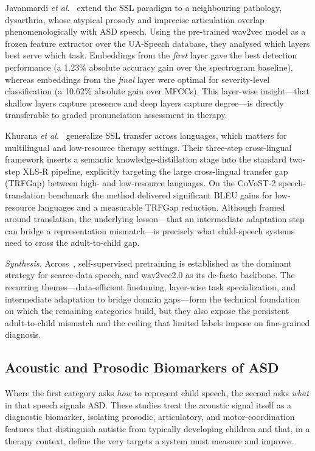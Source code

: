 \documentclass[conference]{IEEEtran}
\begin{document}
Javanmardi \textit{et al.}~\cite{ref4} extend the SSL paradigm to a neighbouring pathology, dysarthria, whose atypical prosody and imprecise articulation overlap phenomenologically with ASD speech. Using the pre-trained wav2vec model as a frozen feature extractor over the UA-Speech database, they analysed which layers best serve which task. Embeddings from the \emph{first} layer gave the best detection performance (a 1.23\% absolute accuracy gain over the spectrogram baseline), whereas embeddings from the \emph{final} layer were optimal for severity-level classification (a 10.62\% absolute gain over MFCCs). This layer-wise insight---that shallow layers capture presence and deep layers capture degree---is directly transferable to graded pronunciation assessment in therapy.

Khurana \textit{et al.}~\cite{ref5} generalize SSL transfer across languages, which matters for multilingual and low-resource therapy settings. Their three-step cross-lingual framework inserts a semantic knowledge-distillation stage into the standard two-step XLS-R pipeline, explicitly targeting the large cross-lingual transfer gap (TRFGap) between high- and low-resource languages. On the CoVoST-2 speech-translation benchmark the method delivered significant BLEU gains for low-resource languages and a measurable TRFGap reduction. Although framed around translation, the underlying lesson---that an intermediate adaptation step can bridge a representation mismatch---is precisely what child-speech systems need to cross the adult-to-child gap.

\emph{Synthesis.} Across~\cite{ref1,ref2,ref3,ref4,ref5}, self-supervised pretraining is established as the dominant strategy for scarce-data speech, and wav2vec2.0 as its de-facto backbone. The recurring themes---data-efficient finetuning, layer-wise task specialization, and intermediate adaptation to bridge domain gaps---form the technical foundation on which the remaining categories build, but they also expose the persistent adult-to-child mismatch and the ceiling that limited labels impose on fine-grained diagnosis.

\subsection{Acoustic and Prosodic Biomarkers of ASD}
Where the first category asks \emph{how} to represent child speech, the second asks \emph{what} in that speech signals ASD. These studies treat the acoustic signal itself as a diagnostic biomarker, isolating prosodic, articulatory, and motor-coordination features that distinguish autistic from typically developing children and that, in a therapy context, define the very targets a system must measure and improve.
\end{document}

